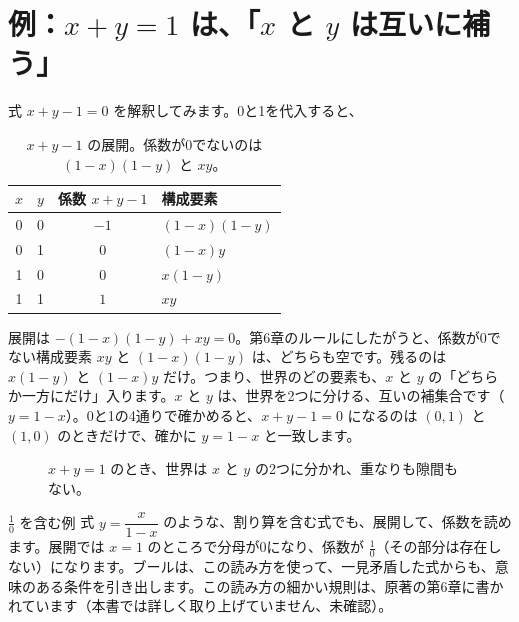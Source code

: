 \documentclass[a4paper,11pt,openany]{ltjsbook}
\begin{document}
\section{例：$x+y=1$ は、「$x$ と $y$ は互いに補う」}

式 $x+y-1=0$ を解釈してみます。0と1を代入すると、
\begin{table}[htbp]
\centering
\begin{tabular}{cc|c|l}
\toprule
$x$ & $y$ & 係数 $x+y-1$ & 構成要素\\
\midrule
0 & 0 & $-1$ & $(1-x)(1-y)$\\
0 & 1 & $0$ & $(1-x)y$\\
1 & 0 & $0$ & $x(1-y)$\\
1 & 1 & $1$ & $xy$\\
\bottomrule
\end{tabular}
\caption{$x+y-1$ の展開。係数が0でないのは $(1-x)(1-y)$ と $xy$。}
\end{table}

展開は $-(1-x)(1-y)+xy=0$。第6章のルールにしたがうと、係数が0でない構成要素 $xy$ と $(1-x)(1-y)$ は、どちらも空です。残るのは $x(1-y)$ と $(1-x)y$ だけ。つまり、世界のどの要素も、$x$ と $y$ の「どちらか一方にだけ」入ります。$x$ と $y$ は、世界を2つに分ける、互いの補集合です（$y=1-x$）。0と1の4通りで確かめると、$x+y-1=0$ になるのは $(0,1)$ と $(1,0)$ のときだけで、確かに $y=1-x$ と一致します。

\begin{figure}[htbp]
\centering
{}
\caption{$x+y=1$ のとき、世界は $x$ と $y$ の2つに分かれ、重なりも隙間もない。}
\end{figure}

\begin{examplebox}{$\tfrac10$ を含む例}
式 $y=\dfrac{x}{1-x}$ のような、割り算を含む式でも、展開して、係数を読めます。展開では $x=1$ のところで分母が0になり、係数が $\tfrac10$（その部分は存在しない）になります。ブールは、この読み方を使って、一見矛盾した式からも、意味のある条件を引き出します。この読み方の細かい規則は、原著の第6章に書かれています（本書では詳しく取り上げていません、未確認）。
\end{examplebox}
\end{document}
